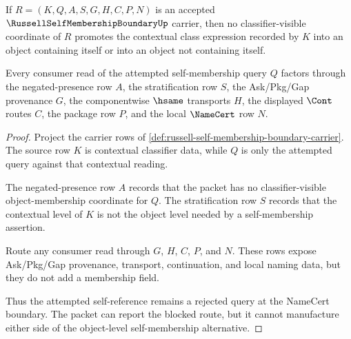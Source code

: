 \begin{theorem}
\label{thm:russell-self-membership-boundary-rejection}
If $R=(K,Q,A,S,G,H,C,P,N)$ is an accepted $\RussellSelfMembershipBoundaryUp$ carrier, then no classifier-visible coordinate of $R$ promotes the contextual class expression recorded by $K$ into an object containing itself or into an object not containing itself.

Every consumer read of the attempted self-membership query $Q$ factors through the negated-presence row $A$, the stratification row $S$, the Ask/Pkg/Gap provenance $G$, the componentwise $\hsame$ transports $H$, the displayed $\Cont$ routes $C$, the package row $P$, and the local $\NameCert$ row $N$.
\end{theorem}
\begin{proof}
Project the carrier rows of \autoref{def:russell-self-membership-boundary-carrier}. The source row $K$ is contextual classifier data, while $Q$ is only the attempted query against that contextual reading.

The negated-presence row $A$ records that the packet has no classifier-visible object-membership coordinate for $Q$. The stratification row $S$ records that the contextual level of $K$ is not the object level needed by a self-membership assertion.

Route any consumer read through $G$, $H$, $C$, $P$, and $N$. These rows expose Ask/Pkg/Gap provenance, transport, continuation, and local naming data, but they do not add a membership field.

Thus the attempted self-reference remains a rejected query at the NameCert boundary. The packet can report the blocked route, but it cannot manufacture either side of the object-level self-membership alternative.
\end{proof}

